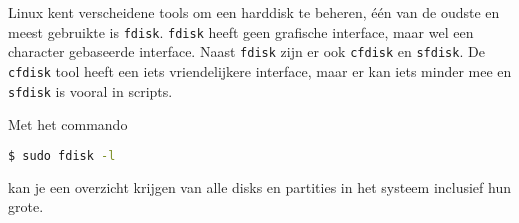 Linux kent verscheidene tools om een harddisk te beheren, \'e\'en van de oudste en meest gebruikte is \texttt{fdisk}. \texttt{fdisk} heeft geen grafische interface, maar wel een character gebaseerde interface. Naast \texttt{fdisk} zijn er ook \texttt{cfdisk} en \texttt{sfdisk}. De \texttt{cfdisk} tool heeft een iets vriendelijkere interface, maar er kan iets minder mee en \texttt{sfdisk} is vooral in scripts.

Met het commando
\begin{lstlisting}[language=bash]
$ sudo fdisk -l
\end{lstlisting}
kan je een overzicht krijgen van alle disks en partities in het systeem inclusief hun grote.
